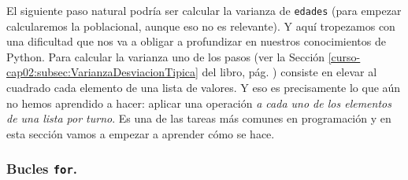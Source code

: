 \documentclass[10pt,a4paper]{article}\usepackage[]{graphicx}\usepackage[]{color}
\begin{document}
El siguiente paso natural podría ser calcular la varianza de {\tt edades} (para empezar calcularemos la poblacional, aunque eso no es relevante). Y aquí tropezamos con una dificultad que nos va a obligar a profundizar en nuestros conocimientos de Python. Para calcular la varianza uno de los pasos (ver la Sección \ref{curso-cap02:subsec:VarianzaDesviacionTipica} del libro, pág. \pageref{curso-cap02:subsec:VarianzaDesviacionTipica}) consiste en elevar al cuadrado cada elemento de una lista de valores. Y eso es precisamente lo que aún no hemos aprendido a hacer: aplicar una operación {\em a cada uno de los elementos de una lista por turno}. Es una de las tareas más comunes en programación y en esta sección vamos a empezar a aprender cómo se hace.

\subsubsection*{Bucles {\tt for}.}
\end{document}
